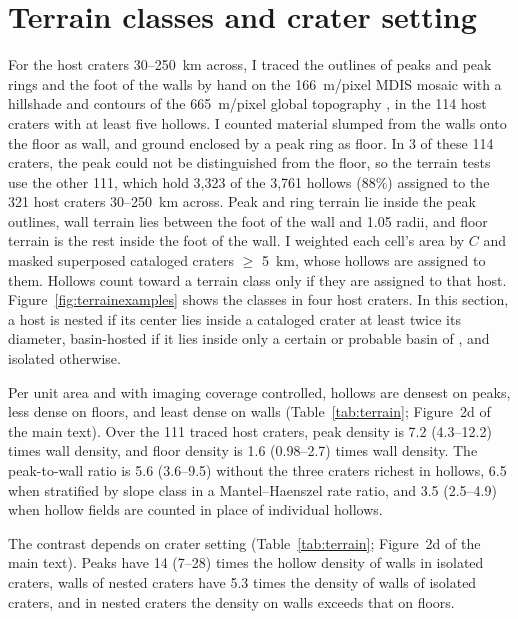 \documentclass{planetary}
\begin{document}
\clearpage

\section{Terrain classes and crater setting}
\label{sec:terrainS}

For the host craters 30--250~km across, I traced the outlines of peaks and peak rings and the foot of the walls by hand on the 166~m/pixel MDIS mosaic \parencite{denevi2018} with a hillshade and contours of the 665~m/pixel global topography \parencite{becker2016,usgs_dem}, in the 114 host craters with at least five hollows. I counted material slumped from the walls onto the floor as wall, and ground enclosed by a peak ring as floor. In 3 of these 114 craters, the peak could not be distinguished from the floor, so the terrain tests use the other 111, which hold 3,323 of the 3,761 hollows (88\%) assigned to the 321 host craters 30--250~km across. Peak and ring terrain lie inside the peak outlines, wall terrain lies between the foot of the wall and 1.05 radii, and floor terrain is the rest inside the foot of the wall. I weighted each cell's area by $C$ and masked superposed cataloged craters $\geq$ 5~km, whose hollows are assigned to them. Hollows count toward a terrain class only if they are assigned to that host. Figure~\ref{fig:terrainexamples} shows the classes in four host craters. In this section, a host is nested if its center lies inside a cataloged crater at least twice its diameter, basin-hosted if it lies inside only a certain or probable basin of \textcite{orgel2020}, and isolated otherwise.

Per unit area and with imaging coverage controlled, hollows are densest on peaks, less dense on floors, and least dense on walls (Table~\ref{tab:terrain}; Figure~2d of the main text). Over the 111 traced host craters, peak density is 7.2 (4.3--12.2) times wall density, and floor density is 1.6 (0.98--2.7) times wall density. The peak-to-wall ratio is 5.6 (3.6--9.5) without the three craters richest in hollows, 6.5 when stratified by slope class in a Mantel--Haenszel rate ratio, and 3.5 (2.5--4.9) when hollow fields are counted in place of individual hollows.

The contrast depends on crater setting (Table~\ref{tab:terrain}; Figure~2d of the main text). Peaks have 14 (7--28) times the hollow density of walls in isolated craters, walls of nested craters have 5.3 times the density of walls of isolated craters, and in nested craters the density on walls exceeds that on floors.
\end{document}

